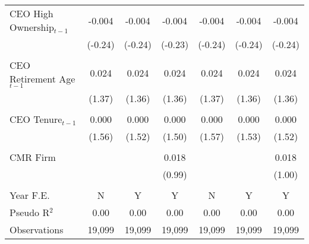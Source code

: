 {\begin{tabular}{l*{6}{c}}
CEO High Ownership$ _{t-1} $&   -0.004         &   -0.004         &   -0.004         &   -0.004         &   -0.004         &   -0.004         \\
                &  (-0.24)         &  (-0.24)         &  (-0.23)         &  (-0.24)         &  (-0.24)         &  (-0.24)         \\
                &                  &                  &                  &                  &                  &                  \\
CEO Retirement Age$ _{t-1} $&    0.024         &    0.024         &    0.024         &    0.024         &    0.024         &    0.024         \\
                &   (1.37)         &   (1.36)         &   (1.36)         &   (1.37)         &   (1.36)         &   (1.36)         \\
                &                  &                  &                  &                  &                  &                  \\
CEO Tenure$ _{t-1} $&    0.000         &    0.000         &    0.000         &    0.000         &    0.000         &    0.000         \\
                &   (1.56)         &   (1.52)         &   (1.50)         &   (1.57)         &   (1.53)         &   (1.52)         \\
                &                  &                  &                  &                  &                  &                  \\
CMR Firm        &                  &                  &    0.018         &                  &                  &    0.018         \\
                &                  &                  &   (0.99)         &                  &                  &   (1.00)         \\
                &                  &                  &                  &                  &                  &                  \\
\midrule Year F.E.&        N         &        Y         &        Y         &        N         &        Y         &        Y         \\
\midrule
Pseudo R$ ^2$   &     0.00         &     0.00         &     0.00         &     0.00         &     0.00         &     0.00         \\
Observations    &   19,099         &   19,099         &   19,099         &   19,099         &   19,099         &   19,099         \\
\bottomrule
\end{tabular}
}
